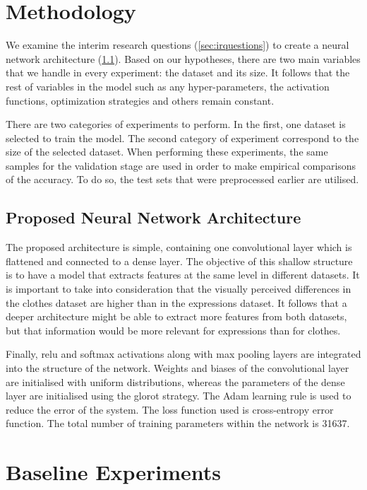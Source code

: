 \documentclass{article}
\begin{document}
\section{Methodology}
\label{sec:methodology}
We examine the interim research questions (\ref{sec:irquestions}) to create a neural network architecture (\ref{sec:arch}). Based on our hypotheses, there are two main variables that we handle in every experiment: the dataset and its size. It follows that the rest of variables in the model such as any hyper-parameters, the activation functions, optimization strategies and others remain constant.

There are two categories of experiments to perform. In the first, one dataset is selected to train the model. The second category of experiment correspond to the size of the selected dataset. When performing these experiments, the same samples for the validation stage are used in order to make empirical comparisons of the accuracy. To do so, the test sets that were preprocessed earlier are utilised.


\subsection{Proposed Neural Network Architecture}
\label{sec:arch}

The proposed architecture is simple, containing one convolutional layer which is flattened and connected to a dense layer. The objective of this shallow structure is to have a model that extracts features at the same level in different datasets. It is important to take into consideration that the visually perceived differences in the clothes dataset are higher than in the expressions dataset. It follows that a deeper architecture might be able to extract more features from both datasets, but that information would be more relevant for expressions than for clothes.

Finally, relu and softmax activations along with max pooling layers are integrated into the structure of the network. Weights and biases of the convolutional layer are initialised with uniform distributions, whereas the parameters of the dense layer are initialised using the glorot strategy. The Adam learning rule is used to reduce the error of the system. The loss function used is cross-entropy error function. The total number of training parameters within the network is 31637. 


\section{Baseline Experiments}
\label{sec:baseline}
\end{document}

